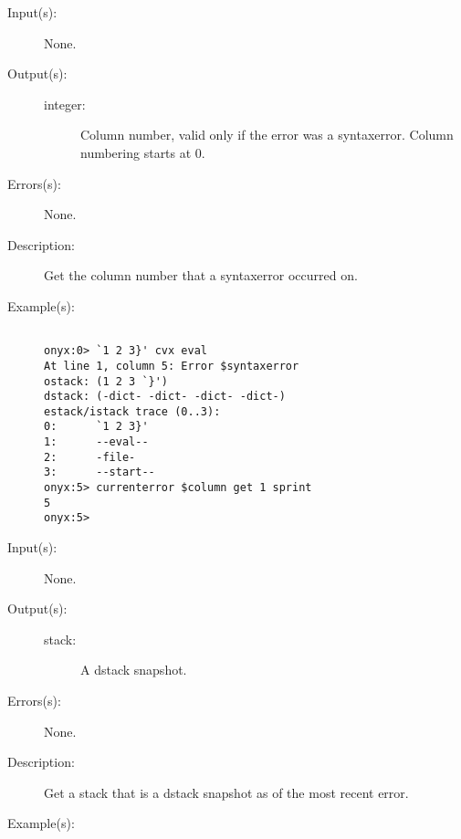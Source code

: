 \begin{description}
\label{currenterror:column}
\item[{\onyxop{--}{column}{integer}}: ]
	\begin{description}\item[]
	\item[Input(s): ] None.
	\item[Output(s): ]
		\begin{description}\item[]
		\item[integer: ]
			Column number, valid only if the error was a
			syntaxerror.  Column numbering starts at 0.
		\end{description}
	\item[Errors(s): ] None.
	\item[Description: ]
		Get the column number that a syntaxerror occurred on.
	\item[Example(s): ]\begin{verbatim}

onyx:0> `1 2 3}' cvx eval
At line 1, column 5: Error $syntaxerror
ostack: (1 2 3 `}')
dstack: (-dict- -dict- -dict- -dict-)
estack/istack trace (0..3):
0:      `1 2 3}'
1:      --eval--
2:      -file-
3:      --start--
onyx:5> currenterror $column get 1 sprint
5
onyx:5>
		\end{verbatim}
	\end{description}
\label{currenterror:dstack}
\item[{\onyxop{--}{dstack}{stack}}: ]
	\begin{description}\item[]
	\item[Input(s): ] None.
	\item[Output(s): ]
		\begin{description}\item[]
		\item[stack: ]
			A dstack snapshot.
		\end{description}
	\item[Errors(s): ] None.
	\item[Description: ]
		Get a stack that is a dstack snapshot as of the most recent
		error.
	\item[Example(s): ]\begin{verbatim}


\end{verbatim}
\end{description}
\end{description}
